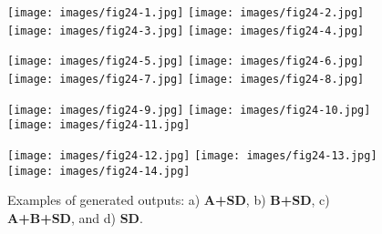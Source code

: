 \documentclass[12pt, letterpaper]{article}
\begin{document}
\begin{figure}[h]
    \centering

    \begin{minipage}{\textwidth}
        \centering
        \texttt{[image: images/fig24-1.jpg]}
        \texttt{[image: images/fig24-2.jpg]}
        \texttt{[image: images/fig24-3.jpg]}
        \texttt{[image: images/fig24-4.jpg]}
        \label{fig24:row_a}
    \end{minipage}

    \begin{minipage}{\textwidth}
        \centering
        \texttt{[image: images/fig24-5.jpg]}
        \texttt{[image: images/fig24-6.jpg]}
        \texttt{[image: images/fig24-7.jpg]}
        \texttt{[image: images/fig24-8.jpg]}
        \label{fig24:row_b}
    \end{minipage}

    \begin{minipage}{\textwidth}
        \centering
        \texttt{[image: images/fig24-9.jpg]}
        \texttt{[image: images/fig24-10.jpg]}
        \texttt{[image: images/fig24-11.jpg]}
        \label{fig24:row_c}
    \end{minipage}

    \begin{minipage}{\textwidth}
        \centering
        \texttt{[image: images/fig24-12.jpg]}
        \texttt{[image: images/fig24-13.jpg]}
        \texttt{[image: images/fig24-14.jpg]}
        \label{fig24:row_d}
    \end{minipage}

    \caption{Examples of generated outputs: a) \textbf{A+SD}, b) \textbf{B+SD}, c) \textbf{A+B+SD}, and d) \textbf{SD}.}
    \label{fig24:all_images}
\end{figure}
\end{document}
